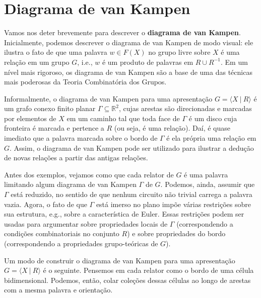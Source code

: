 	\section{Diagrama de van Kampen}
	Vamos nos deter brevemente para descrever o \textbf{diagrama de van Kampen}. 
	Inicialmente, podemos descrever o diagrama de van Kampen de modo visual: ele ilustra o fato de que uma
	palavra $w\in F(X)$ no grupo livre sobre $X$ é uma relação em um grupo $G$, i.e., $w$ é um produto de
	palavras em $R\cup R^{-1}$. Em um nível mais rigoroso, os diagrama de van Kampen são a base de uma das
	técnicas mais poderosas da Teoria Combinatória dos Grupos.
	
	\par\vspace{0.3cm} Informalmente, o diagrama de van Kampen para uma apresentação 
	$G = \langle X \ | \ R \rangle$ é um grafo conexo finito planar $\Gamma\subseteq\mathbb{R}^2$, 
	cujas arestas são direcionadas e marcadas por elementos de $X$ em um caminho tal que toda face 
	de $\Gamma$ é um disco cuja fronteira é marcada e pertence a $R$ (ou seja, é uma relação). 
	Daí, é quase imediato que a palavra marcada sobre o bordo de $\Gamma$ é ela própria uma relação em $G$.
	Assim, o diagrama de van Kampen pode ser utilizado para ilustrar a dedução de novas relações a 
	partir das antigas relações.
	
	\par\vspace{0.3cm} Antes dos exemplos, vejamos como que cada relator de $G$ é uma palavra limitando 
	algum diagrama de van Kampen $\Gamma$ de $G$. Podemos, ainda, assumir que $\Gamma$ está reduzido, 
	no sentido de que nenhum circuito não trivial carrega a palavra vazia. Agora, o fato de que 
	$\Gamma$ está imerso no plano impõe várias restrições sobre sua estrutura, e.g., sobre a 
	característica de Euler. Essas restrições podem ser usadas para argumentar sobre propriedades 
	locais de $\Gamma$ (correspondendo a condições combinatoriais no conjunto $R$) e sobre 
	propriedades do bordo (correspondendo a propriedades grupo-teóricas de $G$).
	
	\par\vspace{0.3cm} Um modo de construir o diagrama de van Kampen para uma apresentação 
	$G = \langle X \ | \ R \rangle$ é o seguinte. Pensemos em cada relator como o bordo de uma 
	célula bidimensional. Podemos, então, colar coleções dessas células ao longo de arestas com 
	a mesma palavra e orientação.
	
